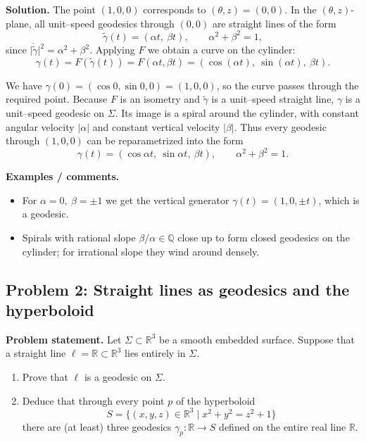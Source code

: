 \documentclass[12pt,a4paper]{article}
\theoremstyle{plain}
\theoremstyle{definition}      %
\begin{document}
	\medskip
	\textbf{Solution.}
	The point $(1,0,0)$ corresponds to $(\theta,z)=(0,0)$.
	In the $(\theta,z)$-plane, all unit--speed geodesics through $(0,0)$ are straight
	lines of the form
	\[
	\widetilde\gamma(t) = (\alpha t,\ \beta t),
	\qquad \alpha^2+\beta^2=1,
	\]
	since $\lvert\dot{\widetilde\gamma}\rvert^2=\alpha^2+\beta^2$.
	Applying $F$ we obtain a curve on the cylinder:
	\[
	\gamma(t)=F(\widetilde\gamma(t))
	=F(\alpha t,\beta t)
	=(\cos(\alpha t),\ \sin(\alpha t),\ \beta t).
	\]
	
	We have $\gamma(0)=(\cos 0,\sin 0,0)=(1,0,0)$, so the curve passes through
	the required point. Because $F$ is an isometry and $\widetilde\gamma$ is a
	unit--speed straight line, $\gamma$ is a unit--speed geodesic on $\Sigma$.
	Its image is a spiral around the cylinder, with constant angular velocity
	$\lvert\alpha\rvert$ and constant vertical velocity $\lvert\beta\rvert$.
	Thus every geodesic through $(1,0,0)$ can be reparametrized into the form
	\[
	\gamma(t)=(\cos\alpha t,\ \sin\alpha t,\ \beta t),
	\qquad \alpha^2+\beta^2=1.
	\]
	
	\medskip
	\textbf{Examples / comments.}
	\begin{itemize}
		\item For $\alpha=0,\ \beta=\pm1$ we get the vertical generator
		$\gamma(t)=(1,0,\pm t)$, which is a geodesic.
		\item Spirals with rational slope $\beta/\alpha\in\mathbb Q$ close up to
		form closed geodesics on the cylinder; for irrational slope they
		wind around densely.
	\end{itemize}
	
	\subsection*{Problem 2: Straight lines as geodesics and the hyperboloid}
	
	\textbf{Problem statement.}
	Let $\Sigma\subset\mathbb R^3$ be a smooth embedded surface.
	Suppose that a straight line $\ell=\mathbb R\subset\mathbb R^3$ lies entirely
	in $\Sigma$.
	\begin{enumerate}
		\item Prove that $\ell$ is a geodesic on $\Sigma$.
		\item Deduce that through every point $p$ of the hyperboloid
		\[
		S = \{(x,y,z)\in\mathbb R^3 \mid x^2 + y^2 = z^2 + 1\}
		\]
		there are (at least) three geodesics $\gamma_p:\mathbb R\to S$
		defined on the entire real line $\mathbb R$.
	\end{enumerate}
	
\end{document}

